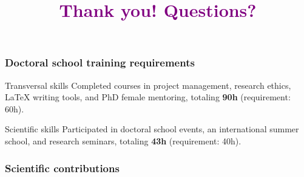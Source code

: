 \documentclass[11pt,aspectratio=1610]{beamer}
\begin{document}

    \begin{frame}
        \frametitle{Doctoral school training requirements}
        \begin{block}{Transversal skills}
            Completed courses in project management, research ethics, \LaTeX{} writing tools, and PhD female mentoring, totaling \textbf{90h} (requirement: 60h).
        \end{block}
        \pause
        \begin{block}{Scientific skills}
            Participated in doctoral school events, an international summer school, and research seminars, totaling \textbf{43h} (requirement: 40h).
        \end{block}
    \end{frame}


    \begin{frame}
        \frametitle{Scientific contributions}
         
          
        \end{frame}


    \title{\textcolor{purple}{Thank you! Questions?}}
    \begin{frame}{}
        \maketitle
    \end{frame}

    
\end{document}
